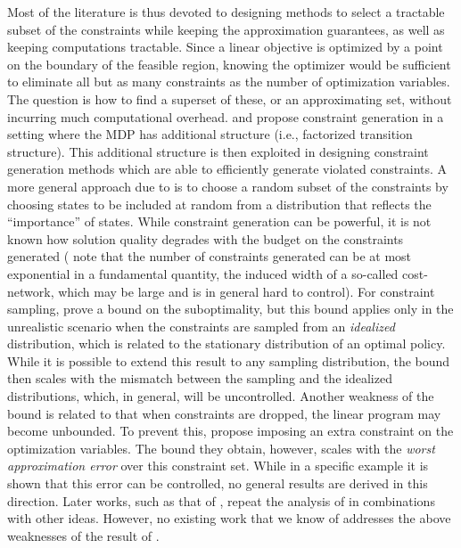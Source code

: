 \documentclass[12pt,draftcls,onecolumn]{IEEEtran}
\begin{document}
Most of the literature is thus devoted to designing methods to select a tractable subset of the constraints while keeping the approximation guarantees, as well as keeping computations tractable.
Since a linear objective is optimized by a point on the boundary of the feasible region,
knowing the optimizer would be sufficient to eliminate all but
as many constraints as the number of optimization variables.
The question is how to find a superset of these, or an approximating set, without incurring much computational overhead.
\citet{schuurmans} and \citet{gkp} propose constraint generation in a setting
where the MDP has additional structure (i.e., factorized transition structure).
This additional structure is then exploited in designing constraint generation methods which are able to efficiently generate
violated constraints. A more general approach due to \citet{CS}
is to choose a random subset of the constraints
by choosing states to be included at random from a distribution that reflects the ``importance'' of states.
While constraint generation can be powerful,
it is not known how solution quality degrades with the budget on the constraints generated
(\citeauthor{gkp} note that the number of constraints generated can be at most exponential in a fundamental quantity,
the induced width of a so-called cost-network, which may be large and is in general hard to control).
For constraint sampling,  \citet{CS} prove a bound on the suboptimality, but this bound applies only
in the unrealistic scenario when the constraints are sampled from an \emph{idealized} distribution,
which is related to the stationary distribution of an optimal policy.
While it is possible to extend this result
to any sampling distribution, the bound then scales with the mismatch between the sampling and the idealized
distributions, which, in general, will be uncontrolled.
Another weakness of the bound is related to that when constraints are dropped, the linear program may become
unbounded. To prevent this, \citet{CS}  propose imposing an extra constraint on the optimization variables.
The bound they obtain, however, scales with the \emph{worst approximation error} over this constraint set.
While in a specific example it is shown that this error can be controlled, no general results are derived in this direction.
Later works, such as that of
\citet{SALP,BhatFaMo12:SALPNP},  repeat the analysis of \citet{CS}
in combinations with other ideas. However, no existing work that we know of addresses the above weaknesses of the result of \citet{CS}.
\end{document}
